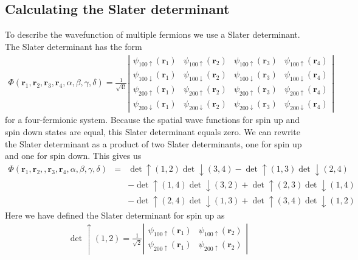 	\subsection{Calculating the Slater determinant}
		\label{sec:slaterdeterminant}
			To describe the wavefunction of multiple fermions we use a Slater
			determinant. The Slater determinant has the form
			\begin{align}
				\Phi(\mathbf{r}_{1},\mathbf{r}_{2},\mathbf{r}_{3},\mathbf{r}_{4},\alpha,\beta,\gamma,\delta)=\frac{1}{\sqrt{4!}}\left|\begin{array}{cccc}
				\psi_{100\uparrow}(\mathbf{r}_{1}) & \psi_{100\uparrow}(\mathbf{r}_{2}) & \psi_{100\uparrow}(\mathbf{r}_{3}) & \psi_{100\uparrow}(\mathbf{r}_{4})\\
				\psi_{100\downarrow}(\mathbf{r}_{1}) & \psi_{100\downarrow}(\mathbf{r}_{2}) & \psi_{100\downarrow}(\mathbf{r}_{3}) & \psi_{100\downarrow}(\mathbf{r}_{4})\\
				\psi_{200\uparrow}(\mathbf{r}_{1}) & \psi_{200\uparrow}(\mathbf{r}_{2}) & \psi_{200\uparrow}(\mathbf{r}_{3}) & \psi_{200\uparrow}(\mathbf{r}_{4})\\
				\psi_{200\downarrow}(\mathbf{r}_{1}) & \psi_{200\downarrow}(\mathbf{r}_{2}) & \psi_{200\downarrow}(\mathbf{r}_{3}) & \psi_{200\downarrow}(\mathbf{r}_{4})
				\end{array}\right|
			\end{align}
			for a four-fermionic system. Because the spatial wave functions for
			spin up and spin down states are equal, this Slater determinant equals
			zero. We can rewrite the Slater determinant as a product of two Slater
			determinants, one for spin up and one for spin down. This gives us
			\begin{eqnarray*}
				\Phi(\mathbf{r}_{1},\mathbf{r}_{2},,\mathbf{r}_{3},\mathbf{r}_{4},\alpha,\beta,\gamma,\delta) & = & \det\uparrow(1,2)\det\downarrow(3,4)-\det\uparrow(1,3)\det\downarrow(2,4)\\
		 		&  & -\det\uparrow(1,4)\det\downarrow(3,2)+\det\uparrow(2,3)\det\downarrow(1,4)\\
		 		&  & -\det\uparrow(2,4)\det\downarrow(1,3)+\det\uparrow(3,4)\det\downarrow(1,2)
			\end{eqnarray*}
			Here we have defined the Slater determinant for spin up as
			\begin{align}
				\det\uparrow(1,2)=\frac{1}{\sqrt{2}}\left|\begin{array}{cc}
				\psi_{100\uparrow}(\mathbf{r}_{1}) & \psi_{100\uparrow}(\mathbf{r}_{2})\\
				\psi_{200\uparrow}(\mathbf{r}_{1}) & \psi_{200\uparrow}(\mathbf{r}_{2})
				\end{array}\right|
			\end{align}
